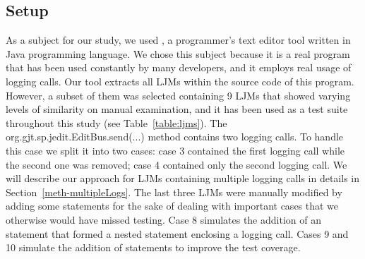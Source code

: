 \subsection{Setup}  \label{study1_setup}

As a subject for our study, we used , a programmer’s text editor tool written in Java programming language. We chose this subject because it is a real program that has been used constantly by many developers, and it employs real usage of logging calls. Our tool extracts all LJMs within the source code of this program. However, a subset of them was selected containing 9 LJMs that showed varying levels of similarity on manual examination, and it has been used as a test suite throughout this study (see Table~\ref{table:ljms}). The org.gjt.sp.jedit.EditBus.send(...) method contains two logging calls. To handle this case we split it into two cases: case 3 contained the first logging call while the second one was removed; case 4 contained only the second logging call. We will describe our approach for LJMs containing multiple logging calls in details in Section~\ref{meth-multipleLogs}. The last three LJMs were manually modified by adding some statements for the sake of dealing with important cases that we otherwise would have missed testing. Case 8 simulates the addition of an statement that formed a nested statement enclosing a logging call. Cases 9 and 10 simulate the addition of statements to improve the test coverage.


